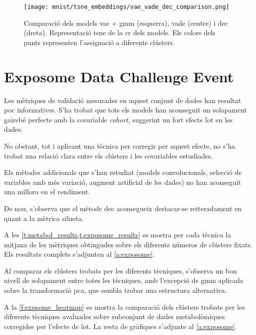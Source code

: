 \documentclass[CAT,BIB]{TFUOC}%
\begin{document}
        \begin{figure}[p]
            \centering
            \texttt{[image: mnist/tsne\_embeddings/vae\_vade\_dec\_comparison.png]}
            \caption[Comparació dels models VAE, VaDE i DEC]{
                Comparació dels models \gls{vae} + \gls{gmm} (esquerra), \gls{vade} (centre) i \gls{dec} (dreta).
                Representació \gls{tsne} de la \gls{cr} dels models.
                Els colors dels punts representen l'assignació a diferents clústers.
            }
            \label{f:vaevadedec_comp}
        \end{figure}


    \section{Exposome Data Challenge Event}
    \label{s:results_exposome}

        Les mètriques de validació mesurades en aquest conjunt de dades
        han resultat poc informatives.
        S'ha trobat que tots els models han aconseguit
        un solapament gairebé perfecte
        amb la covariable \textit{cohort},
        suggerint un fort efecte lot en les dades.

        No obstant,
        tot i aplicant una tècnica per corregir per aquest efecte,
        no s'ha trobat una relació clara entre els clústers
        i les covariables estudiades.

        Els mètodes addicionals que s'han estudiat
        (models convolucionals,
        selecció de variables amb més variació,
        augment artificial de les dades)
        no han aconseguit una millora en el rendiment.

        De nou, s'observa que el mètode \gls{dec}
        aconsegueix destacar-se reiteradament en quant a la mètrica silueta.

        A les \cref{t:metabol_results,t:exposome_results} es mostra
        per cada tècnica
        la mitjana de les mètriques obtingudes
        sobre els diferents números de clústers fixats.
        Els resultats complets s'adjunten al \cref{a:exposome}.

        Al comparar els clústers trobats per les diferents tècniques,
        s'observa un bon nivell de solapament entre totes les tècniques,
        amb l'excepció de \gls{gmm} aplicada sobre la transformació \gls{pca},
        que sembla trobar una estructura alternativa.

        A la \cref{f:expsome_heatmap} es mostra la comparació dels clústers
        trobats per les diferents tècniques avaluades
        sobre subconjunt de dades metabolòmiques corregides per l'efecte de lot.
        La resta de gràfiques s'adjunte al \cref{a:exposome}.
\end{document}
